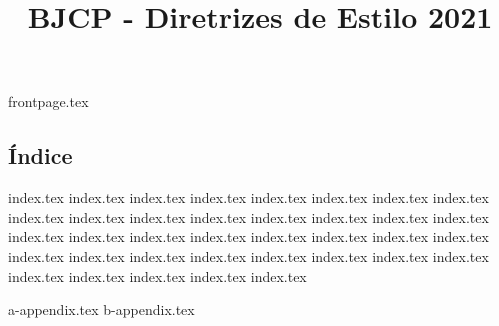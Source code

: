 \documentclass[a4paper, 9t]{article}
\title{BJCP - Diretrizes de Estilo 2021}
\renewcommand*\contentsname{}
\begin{document}
\raggedcolumns

{frontpage.tex}
\begin{multicols*}{2}
\section*{Índice}
\renewcommand\contentsname{}
\tableofcontents
\end{multicols*}

{index.tex}
{index.tex}
{index.tex}
{index.tex}
{index.tex}
{index.tex}
{index.tex}
{index.tex}
{index.tex}
{index.tex}
{index.tex}
{index.tex}
{index.tex}
{index.tex}
{index.tex}
{index.tex}
{index.tex}
{index.tex}
{index.tex}
{index.tex}
{index.tex}
{index.tex}
{index.tex}
{index.tex}
{index.tex}
{index.tex}
{index.tex}
{index.tex}
{index.tex}
{index.tex}
{index.tex}
{index.tex}
{index.tex}
{index.tex}
{index.tex}
{index.tex}
{index.tex}

{a-appendix.tex}
{b-appendix.tex}
\end{document}
